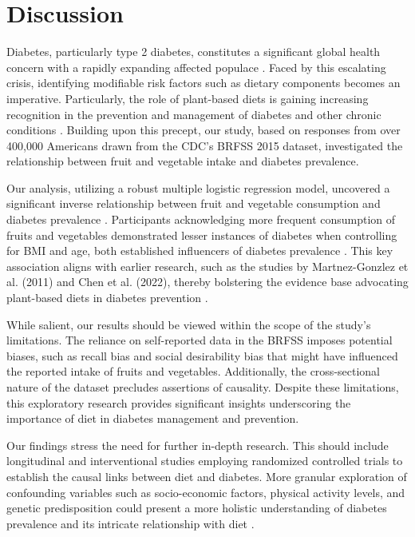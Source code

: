 \documentclass[11pt]{article}
\begin{document}
\section*{Discussion}

Diabetes, particularly type 2 diabetes, constitutes a significant global health concern with a rapidly expanding affected populace \cite{Akter2014PrevalenceOD, Lam2012TheWD, Wu2014RiskFC}. Faced by this escalating crisis, identifying modifiable risk factors such as dietary components becomes an imperative. Particularly, the role of plant-based diets is gaining increasing recognition in the prevention and management of diabetes and other chronic conditions \cite{Martnez-Gonzlez2011LowCO, Chen2022TheAB}. Building upon this precept, our study, based on responses from over 400,000 Americans drawn from the CDC's BRFSS 2015 dataset, investigated the relationship between fruit and vegetable intake and diabetes prevalence.

Our analysis, utilizing a robust multiple logistic regression model, uncovered a significant inverse relationship between fruit and vegetable consumption and diabetes prevalence \cite{Cohen1979AppliedMR, Sperandei2014UnderstandingLR}. Participants acknowledging more frequent consumption of fruits and vegetables demonstrated lesser instances of diabetes when controlling for BMI and age, both established influencers of diabetes prevalence \cite{Singh2013TheAQ, Chan1994ObesityFD}. This key association aligns with earlier research, such as the studies by Martnez-Gonzlez et al. (2011) and Chen et al. (2022), thereby bolstering the evidence base advocating plant-based diets in diabetes prevention \cite{Martnez-Gonzlez2011LowCO, Chen2022TheAB}.

While salient, our results should be viewed within the scope of the study's limitations. The reliance on self-reported data in the BRFSS imposes potential biases, such as recall bias and social desirability bias that might have influenced the reported intake of fruits and vegetables. Additionally, the cross-sectional nature of the dataset precludes assertions of causality. Despite these limitations, this exploratory research provides significant insights underscoring the importance of diet in diabetes management and prevention.

Our findings stress the need for further in-depth research. This should include longitudinal and interventional studies employing randomized controlled trials to establish the causal links between diet and diabetes. More granular exploration of confounding variables such as socio-economic factors, physical activity levels, and genetic predisposition could present a more holistic understanding of diabetes prevalence and its intricate relationship with diet \cite{Garduo-Diaz2012PrevalenceRF, Wu2014RiskFC}.
\end{document}
